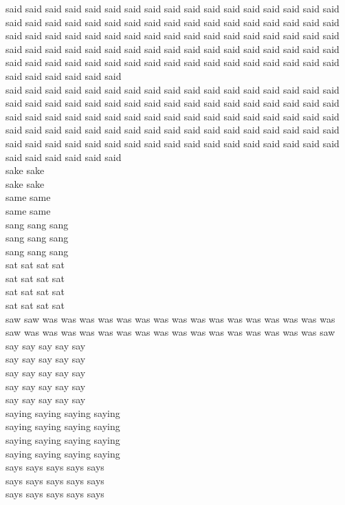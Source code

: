 said said said said said said said said said said said said said said said said said said said said said said said said said said said said said said said said said said said said said said said said said said said said said said said said said said said said said said said said said said said said said said said said said said said said said said said said said said said said said said said said said said said said said said said said said said said\\
said said said said said said said said said said said said said said said said said said said said said said said said said said said said said said said said said said said said said said said said said said said said said said said said said said said said said said said said said said said said said said said said said said said said said said said said said said said said said said said said said said said said said said said said said said said\\
sake sake\\
sake sake\\
same same\\
same same\\
sang sang sang\\
sang sang sang\\
sang sang sang\\
sat sat sat sat\\
sat sat sat sat\\
sat sat sat sat\\
sat sat sat sat\\
saw saw was was was was was was was was was was was was was was was was\\
saw was was was was was was was was was was was was was was was was saw\\
say say say say say\\
say say say say say\\
say say say say say\\
say say say say say\\
say say say say say\\
saying saying saying saying\\
saying saying saying saying\\
saying saying saying saying\\
saying saying saying saying\\
says says says says says\\
says says says says says\\
says says says says says\\
